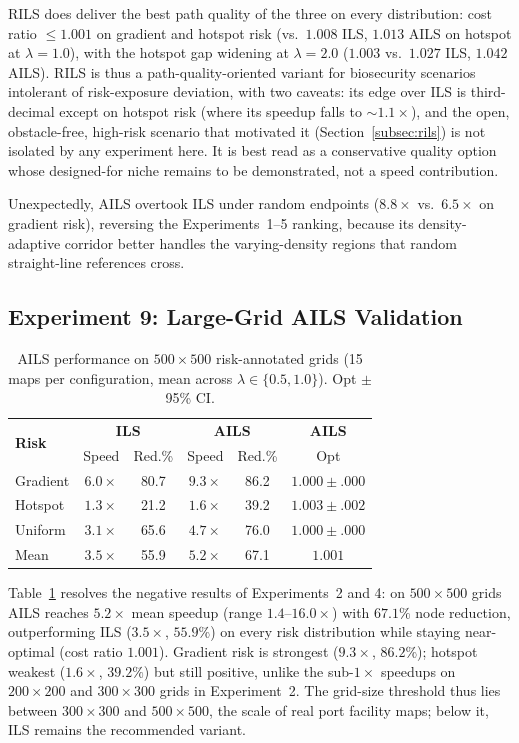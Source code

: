 \documentclass[preprint,12pt,authoryear]{elsarticle}
\begin{document}
RILS does deliver the best path quality of the three on every distribution: cost ratio $\leq 1.001$ on gradient and hotspot risk (vs.\ $1.008$ ILS, $1.013$ AILS on hotspot at $\lambda = 1.0$), with the hotspot gap widening at $\lambda = 2.0$ ($1.003$ vs.\ $1.027$ ILS, $1.042$ AILS). RILS is thus a path-quality-oriented variant for biosecurity scenarios intolerant of risk-exposure deviation, with two caveats: its edge over ILS is third-decimal except on hotspot risk (where its speedup falls to $\sim 1.1\times$), and the open, obstacle-free, high-risk scenario that motivated it (Section~\ref{subsec:rils}) is not isolated by any experiment here. It is best read as a conservative quality option whose designed-for niche remains to be demonstrated, not a speed contribution.

Unexpectedly, AILS overtook ILS under random endpoints ($8.8\times$ vs.\ $6.5\times$ on gradient risk), reversing the Experiments~1--5 ranking, because its density-adaptive corridor better handles the varying-density regions that random straight-line references cross.

\subsection{Experiment 9: Large-Grid AILS Validation}

\begin{table}[!htbp]
\centering
\caption{AILS performance on $500 \times 500$ risk-annotated grids (15 maps per configuration, mean across $\lambda \in \{0.5, 1.0\}$). Opt $\pm$ 95\% CI.}
\label{tab:exp9_large}
\begin{tabular}{lccccc}
\toprule
\multirow{2}{*}{\textbf{Risk}} & \multicolumn{2}{c}{\textbf{ILS}} & \multicolumn{2}{c}{\textbf{AILS}} & \textbf{AILS} \\
& Speed & Red.\% & Speed & Red.\% & Opt \\
\midrule
Gradient & $6.0\times$ & 80.7 & $9.3\times$ & 86.2 & $1.000 \pm .000$ \\
Hotspot  & $1.3\times$ & 21.2 & $1.6\times$ & 39.2 & $1.003 \pm .002$ \\
Uniform  & $3.1\times$ & 65.6 & $4.7\times$ & 76.0 & $1.000 \pm .000$ \\
\midrule
Mean     & $3.5\times$ & 55.9 & $5.2\times$ & 67.1 & $1.001$ \\
\bottomrule
\end{tabular}
\end{table}

Table~\ref{tab:exp9_large} resolves the negative results of Experiments~2 and 4: on $500 \times 500$ grids AILS reaches $5.2\times$ mean speedup (range $1.4$--$16.0\times$) with $67.1\%$ node reduction, outperforming ILS ($3.5\times$, $55.9\%$) on every risk distribution while staying near-optimal (cost ratio $1.001$). Gradient risk is strongest ($9.3\times$, $86.2\%$); hotspot weakest ($1.6\times$, $39.2\%$) but still positive, unlike the sub-$1\times$ speedups on $200 \times 200$ and $300 \times 300$ grids in Experiment~2. The grid-size threshold thus lies between $300 \times 300$ and $500 \times 500$, the scale of real port facility maps; below it, ILS remains the recommended variant.
\end{document}
